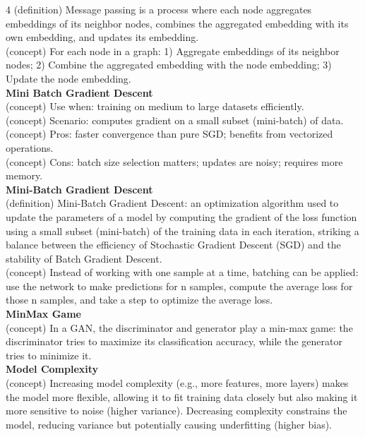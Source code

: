 \documentclass[8pt]{extarticle}
\begin{document}
\begin{multicols}{4}
{(definition) Message passing is a process where each node aggregates embeddings of its neighbor nodes, combines the aggregated embedding with its own embedding, and updates its embedding.\\
(concept) For each node in a graph: 1) Aggregate embeddings of its neighbor nodes; 2) Combine the aggregated embedding with the node embedding; 3) Update the node embedding.\\
\vspace{2pt}\textbf{Mini Batch Gradient Descent}\\
(concept) Use when: training on medium to large datasets efficiently.\\
(concept) Scenario: computes gradient on a small subset (mini-batch) of data.\\
(concept) Pros: faster convergence than pure SGD; benefits from vectorized operations.\\
(concept) Cons: batch size selection matters; updates are noisy; requires more memory.\\
\vspace{2pt}\textbf{Mini-Batch Gradient Descent}\\
(definition) Mini-Batch Gradient Descent: an optimization algorithm used to update the parameters of a model by computing the gradient of the loss function using a small subset (mini-batch) of the training data in each iteration, striking a balance between the efficiency of Stochastic Gradient Descent (SGD) and the stability of Batch Gradient Descent.\\
(concept) Instead of working with one sample at a time, batching can be applied: use the network to make predictions for n samples, compute the average loss for those n samples, and take a step to optimize the average loss.\\
\vspace{2pt}\textbf{MinMax Game}\\
(concept) In a GAN, the discriminator and generator play a min-max game: the discriminator tries to maximize its classification accuracy, while the generator tries to minimize it.\\
\vspace{2pt}\textbf{Model Complexity}\\
(concept) Increasing model complexity (e.g., more features, more layers) makes the model more flexible, allowing it to fit training data closely but also making it more sensitive to noise (higher variance). Decreasing complexity constrains the model, reducing variance but potentially causing underfitting (higher bias).\\
}
\end{multicols}
\end{document}
